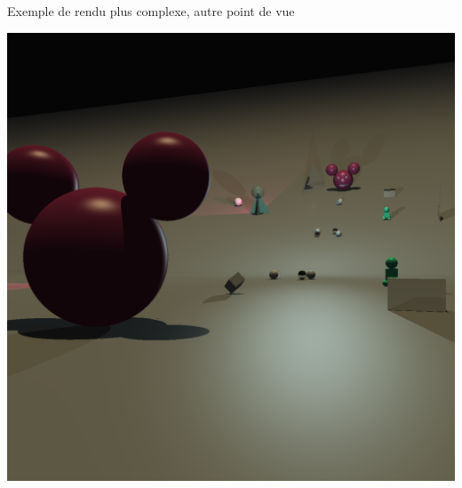 \documentclass{beamer}
\begin{document}
  \begin{frame}{Exemple de rendu plus complexe, autre point de vue}
    \centerline{
      \includegraphics[width=\textwidth, height=0.8\paperheight,
      keepaspectratio=true]{0699.png}
    }
  \end{frame}
\end{document}
